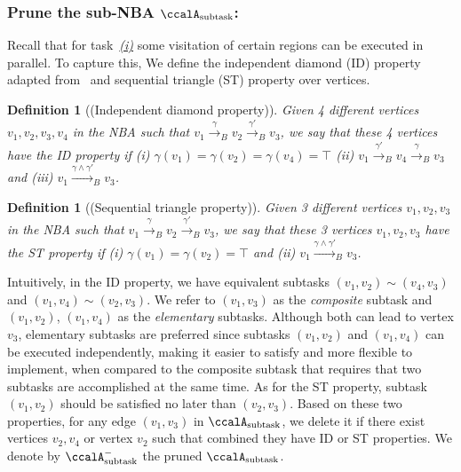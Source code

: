 \documentclass[Afour,sageh,times]{sagej}
\newtheorem{defn}[thm]{Definition}
\newcommand{\auto}[1]{\ccalA_{\text{#1}}}
\begin{document}
  \subsubsection{Prune the sub-NBA \upshape $\auto{subtask}$:} \label{sub-NBA:2}
Recall that for task~\hyperref[task:i]{\it (i)}  some visitation of certain regions can be executed in parallel. To capture this, We define the independent diamond (ID) property adapted from~\cite{stefanescu2006automatic}  and sequential triangle (ST) property over vertices.
\begin{defn}[(Independent diamond property)]\label{defn:id}
Given 4 different vertices $v_1, v_2, v_3, v_4$ in the NBA such that $v_1 \xrightarrow{\gamma}_B v_2 \xrightarrow{\gamma'}_B v_3$, we say that these 4 vertices have the ID property if {\it (i)} $\gamma(v_1) = \gamma(v_2) = \gamma(v_4) = \top$  {\it (ii)} $v_1 \xrightarrow{\gamma'}_B v_4 \xrightarrow{\gamma}_B v_3$ and (iii) $v_1 \xrightarrow{\gamma \wedge \gamma'}_B v_3$.
\end{defn}
\begin{defn}[(Sequential triangle property)]
  Given 3 different vertices $v_1, v_2, v_3$ in the NBA such that $v_1 \xrightarrow{\gamma}_B v_2 \xrightarrow{\gamma'}_B v_3$, we say that these 3 vertices $v_1, v_2, v_3$ have the ST property if {\it (i)} $\gamma(v_1) = \gamma(v_2) = \top$  and {\it (ii)} $v_1 \xrightarrow{\gamma \wedge \gamma'}_B v_3$.
\end{defn}

Intuitively, in the ID property, we have equivalent subtasks $(v_1, v_2) \sim (v_4, v_3)$ and $(v_1, v_4) \sim (v_2, v_3)$. We refer to $(v_1, v_3)$ as the {\it composite} subtask and $(v_1, v_2)$, $(v_1, v_4)$ as the {\it elementary} subtasks.  Although both can lead to vertex $v_3$, elementary subtasks are preferred since subtasks $(v_1, v_2)$ and $(v_1, v_4)$ can be executed independently, making it easier to satisfy and more flexible to implement, when  compared to the composite subtask that requires that two subtasks are accomplished at the same time. As for the ST property, subtask $(v_1, v_2)$ should be satisfied no later than $(v_2, v_3)$. Based on these two properties, for any edge $(v_1, v_3)$ in $\auto{subtask}$, we delete it if there exist vertices $v_2, v_4$ or vertex $v_2$ such that combined they have ID or ST properties. We denote by $\auto{subtask}^-$ the pruned $\auto{subtask}$.
\end{document}
